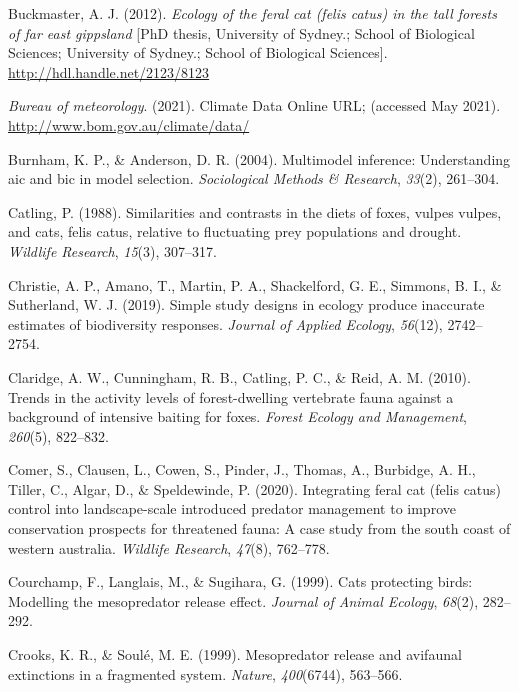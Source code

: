 \documentclass[]{elsarticle} %
\begin{document}
\leavevmode\hypertarget{ref-2123-8123}{}%
Buckmaster, A. J. (2012). \emph{Ecology of the feral cat (felis catus) in the tall forests of far east gippsland} {[}PhD thesis, University of Sydney.; School of Biological Sciences; University of Sydney.; School of Biological Sciences{]}. \url{http://hdl.handle.net/2123/8123}

\leavevmode\hypertarget{ref-BOM2021}{}%
\emph{Bureau of meteorology}. (2021). Climate Data Online URL; (accessed May 2021). \url{http://www.bom.gov.au/climate/data/}

\leavevmode\hypertarget{ref-burnham2004}{}%
Burnham, K. P., \& Anderson, D. R. (2004). Multimodel inference: Understanding aic and bic in model selection. \emph{Sociological Methods \& Research}, \emph{33}(2), 261--304.

\leavevmode\hypertarget{ref-catling1988}{}%
Catling, P. (1988). Similarities and contrasts in the diets of foxes, vulpes vulpes, and cats, felis catus, relative to fluctuating prey populations and drought. \emph{Wildlife Research}, \emph{15}(3), 307--317.

\leavevmode\hypertarget{ref-christie2019}{}%
Christie, A. P., Amano, T., Martin, P. A., Shackelford, G. E., Simmons, B. I., \& Sutherland, W. J. (2019). Simple study designs in ecology produce inaccurate estimates of biodiversity responses. \emph{Journal of Applied Ecology}, \emph{56}(12), 2742--2754.

\leavevmode\hypertarget{ref-claridge2010}{}%
Claridge, A. W., Cunningham, R. B., Catling, P. C., \& Reid, A. M. (2010). Trends in the activity levels of forest-dwelling vertebrate fauna against a background of intensive baiting for foxes. \emph{Forest Ecology and Management}, \emph{260}(5), 822--832.

\leavevmode\hypertarget{ref-comer2020integrating}{}%
Comer, S., Clausen, L., Cowen, S., Pinder, J., Thomas, A., Burbidge, A. H., Tiller, C., Algar, D., \& Speldewinde, P. (2020). Integrating feral cat (felis catus) control into landscape-scale introduced predator management to improve conservation prospects for threatened fauna: A case study from the south coast of western australia. \emph{Wildlife Research}, \emph{47}(8), 762--778.

\leavevmode\hypertarget{ref-courchamp1999}{}%
Courchamp, F., Langlais, M., \& Sugihara, G. (1999). Cats protecting birds: Modelling the mesopredator release effect. \emph{Journal of Animal Ecology}, \emph{68}(2), 282--292.

\leavevmode\hypertarget{ref-crooks1999}{}%
Crooks, K. R., \& Soulé, M. E. (1999). Mesopredator release and avifaunal extinctions in a fragmented system. \emph{Nature}, \emph{400}(6744), 563--566.
\end{document}
